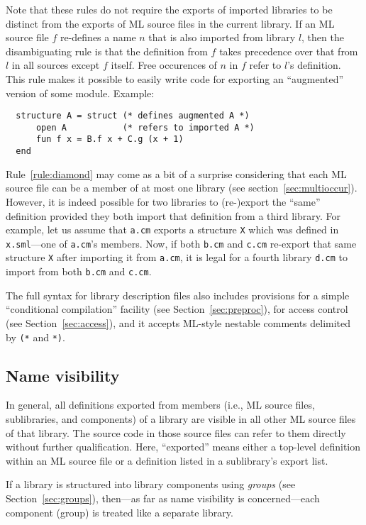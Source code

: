 Note that these rules do not require the exports of imported libraries
to be distinct from the exports of ML source files in the current
library.  If an ML source file $f$ re-defines a name $n$ that is also
imported from library $l$, then the disambiguating rule is that the
definition from $f$ takes precedence over that from $l$ in all sources
except $f$ itself.  Free occurences of $n$ in $f$ refer to $l$'s
definition.  This rule makes it possible to easily write code for
exporting an ``augmented'' version of some module.  Example:

\begin{verbatim}
  structure A = struct (* defines augmented A *)
      open A           (* refers to imported A *)
      fun f x = B.f x + C.g (x + 1)
  end
\end{verbatim}

Rule~\ref{rule:diamond} may come as a bit of a surprise considering
that each ML source file can be a member of at most one library (see
section~\ref{sec:multioccur}).  However, it is indeed possible for two
libraries to (re-)export the ``same'' definition provided they both
import that definition from a third library.  For example, let us
assume that {\tt a.cm} exports a structure {\tt X} which was defined
in {\tt x.sml}---one of {\tt a.cm}'s members.  Now, if both {\tt b.cm}
and {\tt c.cm} re-export that same structure {\tt X} after importing
it from {\tt a.cm}, it is legal for a fourth library {\tt d.cm} to
import from both {\tt b.cm} and {\tt c.cm}.

The full syntax for library description files also includes provisions
for a simple ``conditional compilation'' facility (see
Section~\ref{sec:preproc}), for access control (see
Section~\ref{sec:access}), and it accepts ML-style nestable comments
delimited by \verb|(*| and \verb|*)|.

\subsection{Name visibility}

In general, all definitions exported from members (i.e., ML source
files, sublibraries, and components) of a library are visible in all
other ML source files of that library.  The source code in those
source files can refer to them directly without further qualification.
Here, ``exported'' means either a top-level definition within an ML
source file or a definition listed in a sublibrary's export list.

If a library is structured into library components using {\em groups}
(see Section~\ref{sec:groups}), then---as far as name visibility is
concerned---each component (group) is treated like a separate library.

